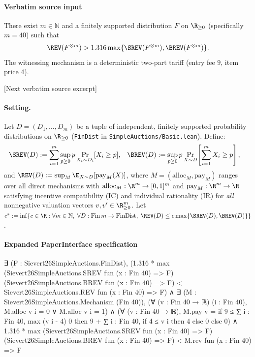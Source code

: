 \documentclass[10pt]{article}
\begin{document}
\paragraph{Verbatim source input}
\begin{ReviewVerbatim}
\begin{theorem}\label{thm:iid}
There exist $m \in \mathbb{N}$ and a finitely supported distribution $F$ on $\R_{\ge 0}$ (specifically $m = 40$) such that
\[
  \REV(F^{\otimes m}) > 1.316 \max\{\SREV(F^{\otimes m}), \BREV(F^{\otimes m})\}.
\]
The witnessing mechanism is a deterministic two-part tariff (entry fee $9$, item price $4$).
\end{theorem}

[Next verbatim source excerpt]

\paragraph{Setting.}
Let $D = (D_1, \dots, D_m)$ be a tuple of independent, finitely supported probability distributions on $\R_{\ge 0}$ (\texttt{FinDist} in \texttt{SimpleAuctions/Basic.lean}). Define:
\begin{align*}
  \SREV(D) &:= \sum_{i=1}^m \sup_{p \ge 0} p \Pr_{X_i \sim D_i}[X_i \ge p], &
  \BREV(D) &:= \sup_{p \ge 0} p \Pr_{X \sim D}\!\left[\sum_{i=1}^m X_i \ge p\right],
\end{align*}
and $\REV(D) := \sup_{M} \E_{X \sim D}[\mathrm{pay}_M(X)]$, where $M = (\mathrm{alloc}_M, \mathrm{pay}_M)$ ranges over all direct mechanisms with $\mathrm{alloc}_M : \R^m \to [0,1]^m$ and $\mathrm{pay}_M : \R^m \to \R$ satisfying incentive compatibility (IC) and individual rationality (IR) for \emph{all} nonnegative valuation vectors $v, v' \in \R_{\ge 0}^m$. Let $c^* := \inf\{c \in \R : \forall m \in \mathbb{N},\; \forall D : \mathrm{Fin}\,m \to \mathrm{FinDist},\; \REV(D) \le c \max\{\SREV(D),\BREV(D)\}\}$.
\end{ReviewVerbatim}



\paragraph{Expanded PaperInterface specification}
\begin{ReviewVerbatim}
∃ (F : Sievert26SimpleAuctions.FinDist),
  (1.316 *
        max (Sievert26SimpleAuctions.SREV fun (x : Fin 40) => F) (Sievert26SimpleAuctions.BREV fun (x : Fin 40) => F) <
      Sievert26SimpleAuctions.REV fun (x : Fin 40) => F) ∧
    ∃ (M : Sievert26SimpleAuctions.Mechanism (Fin 40)),
      (∀ (v : Fin 40 → ℝ) (i : Fin 40), M.alloc v i = 0 ∨ M.alloc v i = 1) ∧
        (∀ (v : Fin 40 → ℝ),
            M.pay v = if 9 ≤ ∑ i : Fin 40, max (v i - 4) 0 then 9 + ∑ i : Fin 40, if 4 ≤ v i then 4 else 0 else 0) ∧
          1.316 *
              max (Sievert26SimpleAuctions.SREV fun (x : Fin 40) => F)
                (Sievert26SimpleAuctions.BREV fun (x : Fin 40) => F) <
            M.rev fun (x : Fin 40) => F
\end{ReviewVerbatim}
\end{document}

